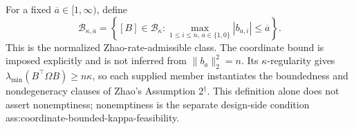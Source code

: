 For a fixed \(\overline a\in[1,\infty)\), define
\[
\mathcal B_{\kappa,\overline a}
=\left\{[B]\in\mathcal B_\kappa:
\max_{1\le i\le n,\,a\in\{1,0\}}|b_{a,i}|\le\overline a\right\}.
\]
This is the normalized Zhao-rate-admissible class.  The coordinate bound is imposed explicitly and is not inferred from \(\lVert b_a\rVert_2^2=n\).  Its \(\kappa\)-regularity gives \(\lambda_{\min}(B^{\top}\Omega B)\ge n\kappa\), so each supplied member instantiates the boundedness and nondegeneracy clauses of Zhao's Assumption 2\(^{\dagger}\).  This definition alone does not assert nonemptiness; nonemptiness is the separate design-side condition ass:coordinate-bounded-kappa-feasibility.